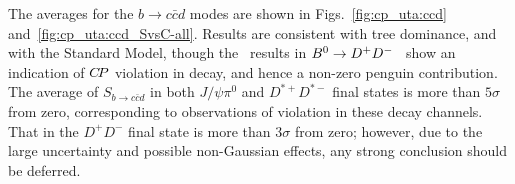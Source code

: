 The averages for the $b \to c\bar c d$ modes 
are shown in Figs.~\ref{fig:cp_uta:ccd} and~\ref{fig:cp_uta:ccd_SvsC-all}.
Results are consistent with tree dominance,
and with the Standard Model,
though the \belle\ results in $B^0 \to D^+D^-$~\cite{Fratina:2007zk}
show an indication of $C\!P$ violation in decay,
and hence a non-zero penguin contribution.
The average of $S_{b \to c\bar c d}$ in both $J/\psi \pi^{0}$ and
$D^{*+}D^{*-}$ final states is more than $5\sigma$ from zero, corresponding to
observations of \CP violation in these decay channels.
That in the $D^+D^-$ final state is more than $3\sigma$ from zero;
however, due to the large uncertainty and possible non-Gaussian effects,
any strong conclusion should be deferred.


